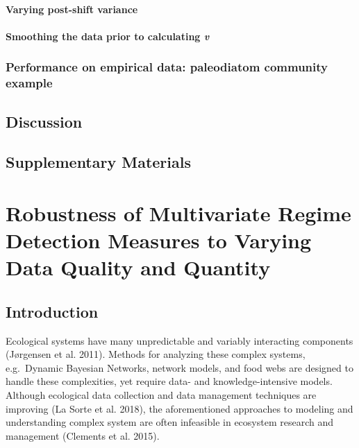 \documentclass[12pt,twoside,openany]{reedthesis}
\begin{document}
\subsubsection{Varying post-shift
variance}\label{varying-post-shift-variance}

\subsubsection{\texorpdfstring{Smoothing the data prior to calculating
\emph{v}}{Smoothing the data prior to calculating v}}\label{smoothing-the-data-prior-to-calculating-v}

\subsection{Performance on empirical data: paleodiatom community
example}\label{performance-on-empirical-data-paleodiatom-community-example}

\section{Discussion}\label{discussion-2}

\section{Supplementary Materials}\label{supplementary-materials}

\chapter{Robustness of Multivariate Regime Detection Measures to Varying
Data Quality and Quantity}\label{resampling}

\section{Introduction}\label{introduction-4}

Ecological systems have many unpredictable and variably interacting
components (Jørgensen et al. 2011). Methods for analyzing these complex
systems, e.g.~Dynamic Bayesian Networks, network models, and food webs
are designed to handle these complexities, yet require data- and
knowledge-intensive models. Although ecological data collection and data
management techniques are improving (La Sorte et al. 2018), the
aforementioned approaches to modeling and understanding complex system
are often infeasible in ecosystem research and management (Clements et
al. 2015).
\end{document}
